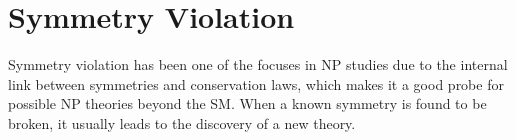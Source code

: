 \begin{comment}
 in a picture where they interact through exchange of certain force carriers which are bosons as well. More specifically, each set of these carriers mediate one type of fundamental interaction. The force in which most of classical objects interact is electromagnetic interaction and it's mediated by photons. The force that plays a role in the $\beta$ decay is weak interaction, of which the mediators are $\textit{W}$ and $\textit{Z}$ bosons. When a proton and a neutron interact within a nuclei transforming into each other, the actual force carriers are 8 types of gluons (or $\pi$ mesons between nucleus), and it's called strong force. Last but not least, in the quantum field theory, all of these particles has zero mass if there's no spontaneous symmetry breaking by introducing one another boson - Higgs boson, in the Lagrangian formalism of all interactions. With this being said, the ``mass'' is taken as the weight of how strong all these particles interact with Higgs field.
 
 However, the S prediction does not perfectly match with experimental observations. Since the day theory was built, generations of particle physics experiments have been searching for evidences beyond the SM, as known as New Physics (NP). New Physics is expected to unfold a more profound truth of nature which hopefully explains these observed mismatches. The studies on these fields naturally draw a large attention from modern physicists, focusing on discovering and explaining the mismatches between the SM predictions and experiments. Among these research fields, the studies of symmetry violations (or called as asymmetries) plays an important role. The studies of symmetries was once the driving force for physicists when building the modern theory about particle physics. It is no wonder that now the violation of symmetries, which  physicists didn't expect to happen , has become the cutting edge research topics for New Physics. 
 
\end{comment}





\section{Symmetry Violation}
Symmetry violation has been one of the focuses in NP studies due to the internal link between symmetries and conservation laws, which makes it a good probe for possible NP theories beyond the SM. When a known symmetry is found to be broken, it usually leads to the discovery of a new theory.


